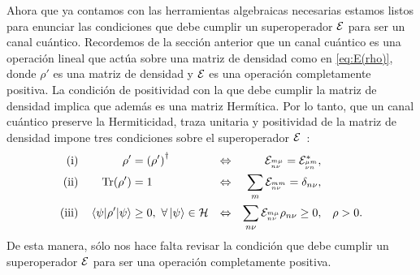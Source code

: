Ahora que ya contamos con las herramientas algebraicas necesarias
estamos listos para enunciar las condiciones que debe cumplir un 
superoperador $\mathcal{E}$ para ser un canal cuántico. 
Recordemos de la sección anterior que un canal cuántico 
es una operación lineal que actúa sobre una matriz de densidad 
como en \eqref{eq:E(rho)}, donde $\rho'$
es una matriz de densidad y $\mathcal{E}$ es una operación completamente positiva.
La condición de positividad con la que debe cumplir la matriz de densidad 
implica que además es una matriz Hermítica. 
Por lo tanto, que un canal cuántico preserve la Hermiticidad, traza unitaria 
y positividad de la matriz de densidad impone tres condiciones 
sobre el superoperador $\mathcal{E}$~\cite{bengtsson_zyczkowski_2017}:
\begin{align}
\txt{(i)}&& \rho'&=\qty(\rho')^{\dagger}&\Leftrightarrow
    && \E_\ind{m\mu}{n\nu}=\E_\ind{\mu m}{\nu n}^*,&&
    \label{eq:H-condition}\\
\txt{(ii)}&&\Tr(\rho')&=1
    &\Leftrightarrow&&  \sum_{m}\E_\ind{mm}{n\nu}=\delta_{n\nu},&
    \label{eq:Tr-condition}\\     
\txt{(iii)}&&\matrixel{\psi}{\rho'}{\psi}&\geq0,\ \forall \ket{\psi} \in \hi
    &\Leftrightarrow&&  \sum_{n\nu}\E_{\ind{m\mu}{n\nu}}\rho_{n\nu}\geq0,& 
    & \rho>0.
    \label{eq:positivity-condition}
\end{align}
De esta manera, sólo nos hace falta revisar la condición que debe cumplir
un superoperador $\mathcal{E}$ para ser una operación completamente positiva.
